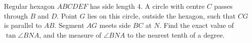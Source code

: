 Regular hexagon $ABCDEF$ has side length $4$. A circle with centre $C$ passes through $B$ and $D$. Point $G$ lies on this circle, outside the hexagon, such that $CG$ is parallel to $AB$. Segment $AG$ meets side $BC$ at $N$. Find the exact value of $\tan\angle BNA$, and the measure of $\angle BNA$ to the nearest tenth of a degree.
